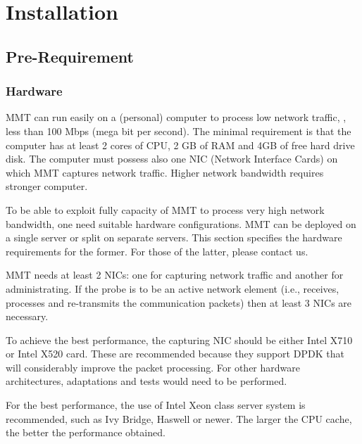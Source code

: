 \clearpage

\section{Installation}
\label{Installing}

\subsection{Pre-Requirement}

\subsubsection{Hardware}



MMT can run easily on a (personal) computer to process low network traffic, \ie, less than 100 Mbps (mega bit per second). The minimal requirement is that the computer has at least 2 cores of CPU, 2 GB of RAM and 4GB of free hard drive disk. The computer must possess also one NIC (Network Interface Cards) on which MMT captures network traffic. 
Higher network bandwidth requires stronger computer.


To be able to exploit fully capacity of MMT to process very high network bandwidth, one need 
suitable hardware configurations.
MMT can be deployed on a single server or split on separate servers. This section specifies the hardware requirements for the former. For those of the latter, please contact us.

MMT needs at least 2 NICs: one for capturing network traffic and another for administrating. If the probe is to be an active network element (i.e., receives, processes and re-transmits the communication packets) then at least 3 NICs are necessary.

\recommend To achieve the best performance, the capturing NIC should be either Intel X710 or Intel X520 card. These are recommended because they support DPDK that will considerably improve the packet processing. For other hardware architectures, adaptations and tests would need to be performed.


 For the best performance, the use of Intel Xeon class server system is recommended, such as Ivy Bridge, Haswell or newer. The larger the CPU cache, the better the performance obtained.

